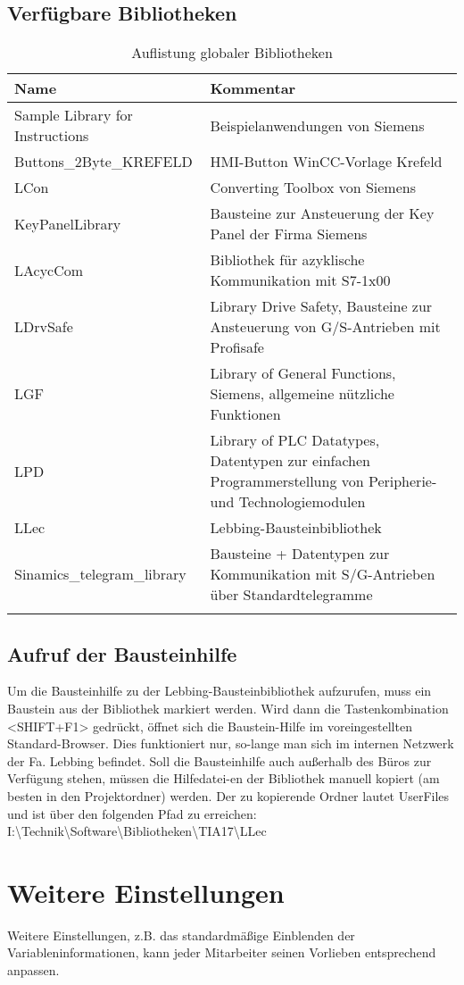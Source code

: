 \clearpage
\subsection{Verfügbare Bibliotheken}\label{subsec:Verfügbare Bibliotheken}

\begin{longtable}{| p{} | p{} |} %
    \hline
    \textbf{Name} & \textbf{Kommentar}\\    
    \hline
    Sample Library for Instructions & Beispielanwendungen von Siemens\\    
    \hline
    Buttons\_2Byte\_KREFELD & HMI-Button WinCC-Vorlage Krefeld\\    
    \hline
    LCon & Converting Toolbox von Siemens\\    
    \hline
    KeyPanelLibrary & Bausteine zur Ansteuerung der Key Panel der Firma Siemens\\    
    \hline
    LAcycCom & Bibliothek für azyklische Kommunikation mit S7-1x00\\    
    \hline
    LDrvSafe & Library Drive Safety, Bausteine zur Ansteuerung von G/S-Antrieben mit Profisafe\\    
    \hline
    LGF & Library of General Functions, Siemens, allgemeine nützliche Funktionen\\    
    \hline
    LPD & Library of PLC Datatypes, Datentypen zur einfachen Programmerstellung von Peripherie- und Technologiemodulen\\    
    \hline
    LLec & Lebbing-Bausteinbibliothek\\    
    \hline
    Sinamics\_telegram\_library & Bausteine + Datentypen zur Kommunikation mit S/G-Antrieben über Standardtelegramme\\    
    \hline
    
    \caption{Auflistung globaler Bibliotheken}\label{tab:Auflistung globaler Bibliotheken} %
\end{longtable}

\subsection{Aufruf der Bausteinhilfe}\label{subsec:Aufruf der Bausteinhilfe}

Um die Bausteinhilfe zu der Lebbing-Bausteinbibliothek aufzurufen, muss ein Baustein aus der Bibliothek markiert werden. Wird dann die Tastenkombination <SHIFT+F1> gedrückt, öffnet sich die Baustein-Hilfe im voreingestellten Standard-Browser. Dies funktioniert nur, so-lange man sich im internen Netzwerk der Fa. Lebbing befindet.
Soll die Bausteinhilfe auch außerhalb des Büros zur Verfügung stehen, müssen die Hilfedatei-en der Bibliothek manuell kopiert (am besten in den Projektordner) werden. Der zu kopierende Ordner lautet \glqq UserFiles\grqq{} und ist über den folgenden Pfad zu erreichen: I:\textbackslash Technik\textbackslash Software\textbackslash Bibliotheken\textbackslash TIA17\textbackslash LLec

\section{Weitere Einstellungen}\label{subsec:Weitere Einstellungen}
Weitere Einstellungen, z.B. das standardmäßige Einblenden der Variableninformationen, kann jeder Mitarbeiter seinen Vorlieben entsprechend anpassen.
